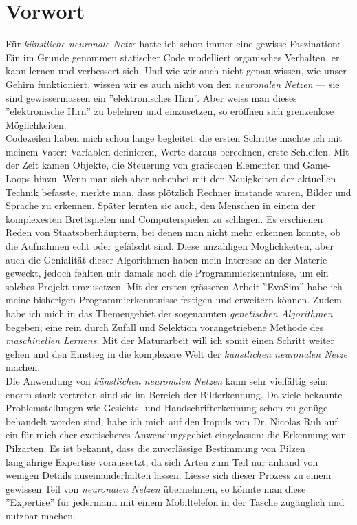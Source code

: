 \section*{Vorwort}
 Für \textit{künstliche neuronale Netze} hatte ich schon immer eine gewisse Faszination: Ein im Grunde genommen statischer Code modelliert organisches Verhalten, er kann lernen und verbessert sich. Und wie wir auch nicht genau wissen, wie unser Gehirn funktioniert, wissen wir es auch nicht von den \textit{neuronalen Netzen} --- sie sind gewissermassen ein ''elektronisches Hirn''. Aber weiss man dieses ''elektronische Hirn'' zu belehren und einzusetzen, so eröffnen sich grenzenlose Möglichkeiten.\\
 
 Codezeilen haben mich schon lange begleitet; die ersten Schritte machte ich mit meinem Vater: Variablen definieren, Werte daraus berechnen, erste Schleifen. Mit der Zeit kamen Objekte, die Steuerung von grafischen Elementen und Game-Loops hinzu. Wenn man sich aber nebenbei mit den Neuigkeiten der aktuellen Technik befasste, merkte man, dass plötzlich Rechner imstande waren, Bilder und Sprache zu erkennen. Später lernten sie auch, den Menschen in einem der komplexesten Brettspielen und Computerspielen zu schlagen. Es erschienen Reden von Staatsoberhäuptern, bei denen man nicht mehr erkennen konnte, ob die Aufnahmen echt oder gefälscht sind. Diese unzähligen Möglichkeiten, aber auch die Genialität dieser Algorithmen haben mein Interesse an der Materie geweckt, jedoch fehlten mir damals noch die Programmierkenntnisse, um ein solches Projekt umzusetzen. Mit der ersten grösseren Arbeit ''EvoSim''\cite{evosim} habe ich meine bisherigen Programmierkenntnisse festigen und erweitern können. Zudem habe ich mich in das Themengebiet der sogenannten \textit{genetischen Algorithmen} begeben; eine rein durch Zufall und Selektion vorangetriebene Methode des \textit{maschinellen Lernens}. Mit der Maturarbeit will ich somit einen Schritt weiter gehen und den Einstieg in die komplexere Welt der \textit{künstlichen neuronalen Netze} machen.\\
 
 Die Anwendung von \textit{künstlichen neuronalen Netzen} kann sehr vielfältig sein; enorm stark vertreten sind sie im Bereich der Bilderkennung. Da viele bekannte Problemstellungen wie Gesichts- und Handschrifterkennung schon zu genüge behandelt worden sind, habe ich mich auf den Impuls von Dr. Nicolas Ruh auf ein für mich eher exotischeres Anwendungsgebiet eingelassen: die Erkennung von Pilzarten. Es ist bekannt, dass die zuverlässige Bestimmung von Pilzen langjährige Expertise voraussetzt, da sich Arten zum Teil nur anhand von wenigen Details auseinanderhalten lassen. Liesse sich dieser Prozess zu einem gewissen Teil von \textit{neuronalen Netzen} übernehmen, so könnte man diese ''Expertise'' für jedermann mit einem Mobiltelefon in der Tasche zugänglich und nutzbar machen.\\ 
 
